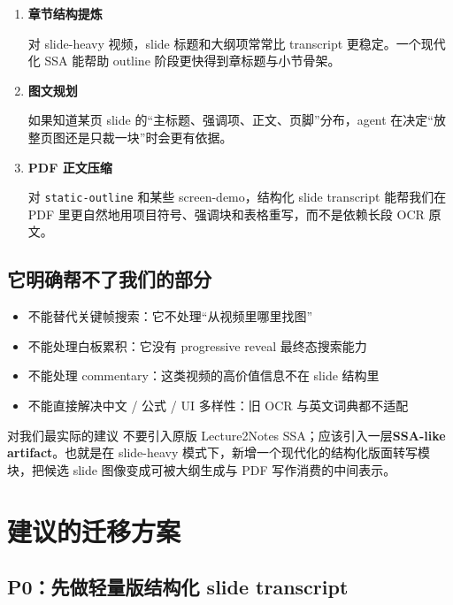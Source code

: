 \documentclass[a4paper]{article}
\begin{document}
\begin{enumerate}
\item \textbf{章节结构提炼}
  
  对 slide-heavy 视频，slide 标题和大纲项常常比 transcript 更稳定。一个现代化 SSA 能帮助 outline 阶段更快得到章标题与小节骨架。

\item \textbf{图文规划}
  
  如果知道某页 slide 的“主标题、强调项、正文、页脚”分布，agent 在决定“放整页图还是只裁一块”时会更有依据。

\item \textbf{PDF 正文压缩}
  
  对 \texttt{static-outline} 和某些 screen-demo，结构化 slide transcript 能帮我们在 PDF 里更自然地用项目符号、强调块和表格重写，而不是依赖长段 OCR 原文。
\end{enumerate}

\subsection{它明确帮不了我们的部分}

\begin{itemize}
\item 不能替代关键帧搜索：它不处理“从视频里哪里找图”
\item 不能处理白板累积：它没有 progressive reveal 最终态搜索能力
\item 不能处理 commentary：这类视频的高价值信息不在 slide 结构里
\item 不能直接解决中文 / 公式 / UI 多样性：旧 OCR 与英文词典都不适配
\end{itemize}

\begin{findingbox}{对我们最实际的建议}
不要引入原版 Lecture2Notes SSA；应该引入一层\textbf{SSA-like artifact}。也就是在 slide-heavy 模式下，新增一个现代化的结构化版面转写模块，把候选 slide 图像变成可被大纲生成与 PDF 写作消费的中间表示。
\end{findingbox}

\section{建议的迁移方案}

\subsection{P0：先做轻量版结构化 slide transcript}
\end{document}
